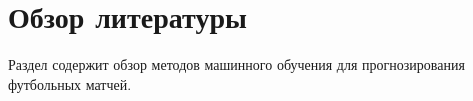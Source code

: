 \section{Обзор литературы}
Раздел содержит обзор методов машинного обучения для прогнозирования футбольных матчей.
